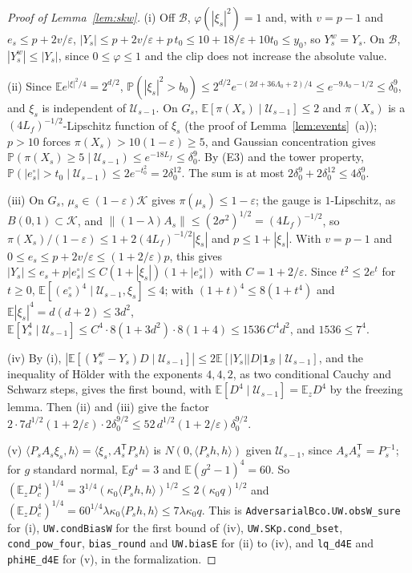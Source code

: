 \documentclass[11pt]{amsart}
\theoremstyle{definition}
\numberwithin{equation}{section}
\newcommand{\E}{\mathbb{E}}
\newcommand{\Prob}{\mathbb{P}}
\newcommand{\cK}{\mathcal{K}}
\newcommand{\ip}[1]{\langle #1\rangle}
\begin{document}
\begin{proof}[Proof of Lemma~\ref{lem:skw}]
(i) Off $\mathcal B$, $\varphi(|\xi_s|^2)=1$ and, with $v=p-1$ and $e_s\le p+2v/\varepsilon$, $|Y_s|\le p+2v/\varepsilon+p\,t_0\le10+18/\varepsilon+10t_0\le y_0$, so $Y^w_s=Y_s$. On $\mathcal B$, $|Y^w_s|\le|Y_s|$, since $0\le\varphi\le1$ and the clip does not increase the absolute value.

(ii) Since $\E e^{|\xi|^2/4}=2^{d/2}$, $\Prob(|\xi_s|^2>b_0)\le2^{d/2}e^{-(2d+36\Lambda_0+2)/4}\le e^{-9\Lambda_0-1/2}\le\delta_0^9$, and $\xi_s$ is independent of $\mathcal U_{s-1}$. On $G_s$, $\E[\pi(X_s)\mid\mathcal U_{s-1}]\le2$ and $\pi(X_s)$ is a $(4L_f)^{-1/2}$-Lipschitz function of $\xi_s$ (the proof of Lemma~\ref{lem:events}~(a)); $p>10$ forces $\pi(X_s)>10(1-\varepsilon)\ge5$, and Gaussian concentration gives $\Prob(\pi(X_s)\ge5\mid\mathcal U_{s-1})\le e^{-18L_f}\le\delta_0^9$. By (E3) and the tower property, $\Prob(|e^\circ_s|>t_0\mid\mathcal U_{s-1})\le2e^{-t_0^2}=2\delta_0^{12}$. The sum is at most $2\delta_0^9+2\delta_0^{12}\le4\delta_0^9$.

(iii) On $G_s$, $\mu_s\in(1-\varepsilon)\cK$ gives $\pi(\mu_s)\le1-\varepsilon$; the gauge is $1$-Lipschitz, as $B(0,1)\subset\cK$, and $\|(1-\lambda)A_s\|\le(2\sigma^2)^{1/2}=(4L_f)^{-1/2}$, so $\pi(X_s)/(1-\varepsilon)\le1+2(4L_f)^{-1/2}|\xi_s|$ and $p\le1+|\xi_s|$. With $v=p-1$ and $0\le e_s\le p+2v/\varepsilon\le(1+2/\varepsilon)p$, this gives $|Y_s|\le e_s+p|e^\circ_s|\le C(1+|\xi_s|)(1+|e^\circ_s|)$ with $C=1+2/\varepsilon$. Since $t^2\le2e^t$ for $t\ge0$, $\E[(e^\circ_s)^4\mid\mathcal U_{s-1},\xi_s]\le4$; with $(1+t)^4\le8(1+t^4)$ and $\E|\xi_s|^4=d(d+2)\le3d^2$, $\E[Y_s^4\mid\mathcal U_{s-1}]\le C^4\cdot8(1+3d^2)\cdot8(1+4)\le1536\,C^4d^2$, and $1536\le7^4$.

(iv) By (i), $|\E[(Y^w_s-Y_s)D\mid\mathcal U_{s-1}]|\le2\E[|Y_s||D|\mathbf 1_{\mathcal B}\mid\mathcal U_{s-1}]$, and the inequality of H\"older with the exponents $4,4,2$, as two conditional Cauchy and Schwarz steps, gives the first bound, with $\E[D^4\mid\mathcal U_{s-1}]=\E_zD^4$ by the freezing lemma. Then (ii) and (iii) give the factor $2\cdot7d^{1/2}(1+2/\varepsilon)\cdot2\delta_0^{9/2}\le52\,d^{1/2}(1+2/\varepsilon)\delta_0^{9/2}$.

(v) $\ip{P_sA_s\xi_s,h}=\ip{\xi_s,A_s^{\mathsf T}P_sh}$ is $N(0,\ip{P_sh,h})$ given $\mathcal U_{s-1}$, since $A_sA_s^{\mathsf T}=P_s^{-1}$; for $g$ standard normal, $\E g^4=3$ and $\E(g^2-1)^4=60$. So $(\E_zD_c^4)^{1/4}=3^{1/4}(\kappa_0\ip{P_sh,h})^{1/2}\le2(\kappa_0q)^{1/2}$ and $(\E_zD_e^4)^{1/4}=60^{1/4}\lambda\kappa_0\ip{P_sh,h}\le7\lambda\kappa_0q$. This is \texttt{AdversarialBco.\allowbreak UW.\allowbreak obsW\_sure} for (i), \texttt{UW.\allowbreak condBiasW} for the first bound of (iv), \texttt{UW.\allowbreak SKp.\allowbreak cond\_bset}, \texttt{cond\_pow\_four}, \texttt{bias\_round} and \texttt{UW.\allowbreak biasE} for (ii) to (iv), and \texttt{lq\_d4E} and \texttt{phiHE\_d4E} for (v), in the formalization.
\end{proof}
\end{document}
